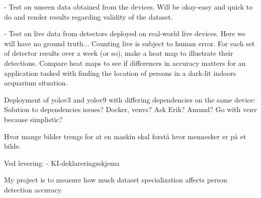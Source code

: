 - Test on unseen data obtained from the devices.
	Will be okay-easy and quick to do and render results regarding validity of the dataset.

- Test on live data from detectors deployed on real-world live devices.
	Here we will have no ground truth... Counting live is subject to human error. 
	For each set of detector results over a week (or so), make a heat map to illustrate their detections. 
	Compare heat maps to see if differences in accuracy matters for an application tasked with finding the location of persons in a dark-lit indoors acquarium situation.

	Deployment of yolov3 and yolov9 with differing dependencies on the same device:
	Solution to dependencies issues? Docker, venvs?	Ask Erik? Amund? Go with venv because simplistic?

Hvor mange bilder trengs for at en maskin skal forstå hvor mennesker er på et bilde.

Ved levering:
- KI-deklareringsskjema

My project is to measure how much dataset specialization affects person detection accuracy.

